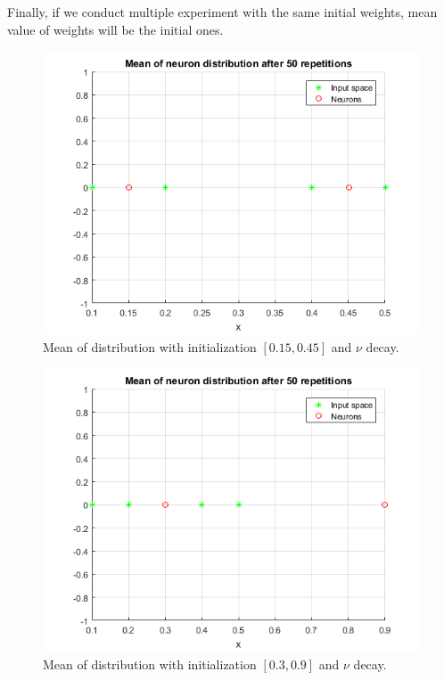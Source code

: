 \documentclass[a4paper, 12pt]{article}
\begin{document}
 \clearpage
Finally, if we conduct multiple experiment with the same initial weights, mean value of weights will be the initial ones.

\begin{figure}[h]
  \centering
  \caption{Mean of distribution with initialization $[0.15, 0.45]$ and $\nu$ decay.}
  \includegraphics[scale = 0.7]{1mean}
\end{figure}

\begin{figure}[h]
  \centering
  \caption{Mean of distribution with initialization $[0.3, 0.9]$ and $\nu$ decay.}
  \includegraphics[scale = 0.7]{2mean}
\end{figure}
\end{document}
